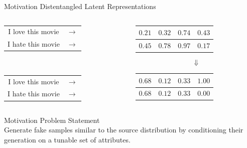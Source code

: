 \documentclass{beamer}
\begin{document}
\begin{frame}{Motivation}
	\centering
	{\Large Distentangled Latent Representations} \\
	\vspace{1cm}
	\begin{columns}[T] %
		\begin{column}{.3\textwidth}
			\centering
			\begin{tabular}{ c c }
				I love this movie & $\rightarrow$ \\
				I hate this movie & $\rightarrow$ \\
			\end{tabular}\\
			\vspace{1.8cm}
			\begin{tabular}{ c c }
				I love this movie & $\rightarrow$ \\
				I hate this movie & $\rightarrow$ \\
			\end{tabular}
		\end{column}
		\hfill
		\begin{column}{.6\textwidth}
			\centering
			\begin{tabular}{ | c | c | c | c | }
				\hline
				$0.21$ & $0.32$ & $0.74$ & $0.43$ \\
				\hline
				\hline
				$0.45$ & $0.78$ & $0.97$ & $0.17$ \\
				\hline
			\end{tabular}
			{\Huge$$\Downarrow$$}
			\begin{tabular}{ | c | c | c | c | }
				\hline
				$0.68$ & $0.12$ & $0.33$ & {\color{red}$1.00$} \\
				\hline
				\hline
				$0.68$ & $0.12$ & $0.33$ & {\color{red}$0.00$} \\
				\hline
			\end{tabular}
		\end{column}
	\end{columns}
\end{frame}


\begin{frame}{Motivation}
	\centering
	{\Huge Problem Statement} \\
	\vspace{1cm}
	{\Large Generate fake samples similar to the source distribution by conditioning their generation on a tunable set of attributes.}
\end{frame}
\end{document}
